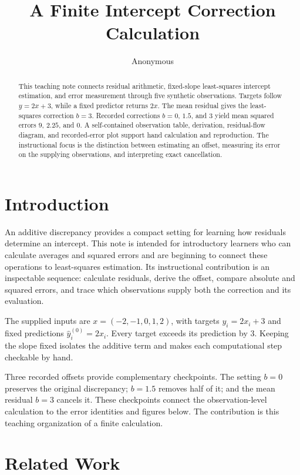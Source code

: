 \documentclass[11pt]{article}
\title{A Finite Intercept Correction Calculation}
\author{Anonymous}
\date{}
\begin{document}
\maketitle

\begin{abstract}
This teaching note connects residual arithmetic, fixed-slope least-squares intercept estimation, and error measurement through five synthetic observations. Targets follow $y=2x+3$, while a fixed predictor returns $2x$. The mean residual gives the least-squares correction $b=3$. Recorded corrections $b=0$, $1.5$, and $3$ yield mean squared errors $9$, $2.25$, and $0$. A self-contained observation table, derivation, residual-flow diagram, and recorded-error plot support hand calculation and reproduction. The instructional focus is the distinction between estimating an offset, measuring its error on the supplying observations, and interpreting exact cancellation.
\end{abstract}

\section{Introduction}

An additive discrepancy provides a compact setting for learning how residuals determine an intercept. This note is intended for introductory learners who can calculate averages and squared errors and are beginning to connect these operations to least-squares estimation. Its instructional contribution is an inspectable sequence: calculate residuals, derive the offset, compare absolute and squared errors, and trace which observations supply both the correction and its evaluation.

The supplied inputs are $x=(-2,-1,0,1,2)$, with targets $y_i=2x_i+3$ and fixed predictions $\hat y_i^{(0)}=2x_i$. Every target exceeds its prediction by $3$. Keeping the slope fixed isolates the additive term and makes each computational step checkable by hand.

Three recorded offsets provide complementary checkpoints. The setting $b=0$ preserves the original discrepancy; $b=1.5$ removes half of it; and the mean residual $b=3$ cancels it. These checkpoints connect the observation-level calculation to the error identities and figures below. The contribution is this teaching organization of a finite calculation.

\section{Related Work}
\end{document}
